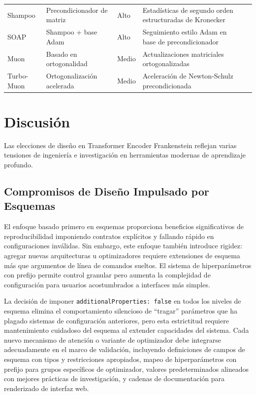 \documentclass[11pt,a4paper]{article}
\begin{document}
\begin{longtable}{p{2.2cm}p{2.8cm}p{2.0cm}p{5.4cm}p{1.8cm}}
Shampoo & Precondicionador de matriz & Alto & Estadísticas de segundo orden estructuradas de Kronecker & \citep{gupta_shampoo_2018} \\
SOAP & Shampoo + base Adam & Alto & Seguimiento estilo Adam en base de precondicionador & \citep{vyas_soap_2024} \\
Muon & Basado en ortogonalidad & Medio & Actualizaciones matriciales ortogonalizadas & \citep{shen_convergence_2025} \\
Turbo-Muon & Ortogonalización acelerada & Medio & Aceleración de Newton-Schulz precondicionada & \citep{boissin_turbo-muon_2025} \\
\bottomrule
\end{longtable}
\normalsize

\section{Discusión}
\label{sec:discussion}

Las elecciones de diseño en Transformer Encoder Frankenstein reflejan varias tensiones de ingeniería e investigación en herramientas modernas de aprendizaje profundo.

\subsection{Compromisos de Diseño Impulsado por Esquemas}

El enfoque basado primero en esquemas proporciona beneficios significativos de reproducibilidad imponiendo contratos explícitos y fallando rápido en configuraciones inválidas. Sin embargo, este enfoque también introduce rigidez: agregar nuevas arquitecturas u optimizadores requiere extensiones de esquema más que argumentos de línea de comandos sueltos. El sistema de hiperparámetros con prefijo permite control granular pero aumenta la complejidad de configuración para usuarios acostumbrados a interfaces más simples.

La decisión de imponer \texttt{additionalProperties: false} en todos los niveles de esquema elimina el comportamiento silencioso de ``tragar'' parámetros que ha plagado sistemas de configuración anteriores, pero esta estrictitud requiere mantenimiento cuidadoso del esquema al extender capacidades del sistema. Cada nuevo mecanismo de atención o variante de optimizador debe integrarse adecuadamente en el marco de validación, incluyendo definiciones de campos de esquema con tipos y restricciones apropiados, mapeo de hiperparámetros con prefijo para grupos específicos de optimizador, valores predeterminados alineados con mejores prácticas de investigación, y cadenas de documentación para renderizado de interfaz web.
\end{document}
